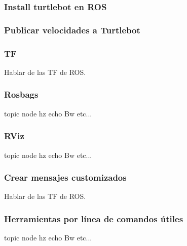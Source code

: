 \begin{frame}
	\frametitle{Install turtlebot en ROS}
	
\end{frame}

\begin{frame}
	\frametitle{Publicar velocidades a Turtlebot}
	
\end{frame}

\begin{frame}
	\frametitle{TF}
	Hablar de las TF de ROS.
	
\end{frame}

\begin{frame}
	\frametitle{Rosbags}
	topic node hz echo Bw etc...
	
\end{frame}

\begin{frame}
	\frametitle{RViz}
	topic node hz echo Bw etc...
	
\end{frame}

\begin{frame}
	\frametitle{Crear mensajes customizados}
	Hablar de las TF de ROS.
	
\end{frame}

\begin{frame}
	\frametitle{Herramientas por línea de comandos útiles}
    topic node hz echo Bw etc...
	
\end{frame}
